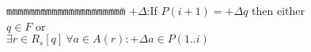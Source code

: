 

\begin{tabbing}
{\tt mmm}\={\tt mmmmmm}\={\tt mmmm}\={\tt mmmm}\={\tt mmmm}\=\kill
\>$+\Delta$:\>If $P(i+1) = +\Delta q$ then either \\
\>\>\> $q\in F$ or \\
\>\>\> $\exists r\in R_s[q] \ \forall a\in A(r): +\Delta a \in P(1..i)$ 
\end{tabbing}

